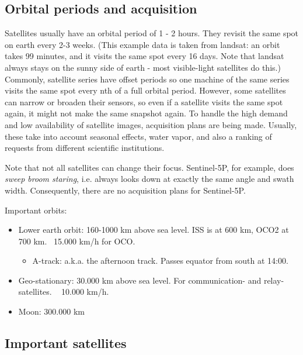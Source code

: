 \subsection{Orbital periods and acquisition}
Satellites usually have an orbital period of 1 - 2 hours. They revisit the same spot on earth every 2-3 weeks.
(This example data is taken from landsat: an orbit takes 99 minutes, and it visits the same spot every 16 days.
Note that landsat always stays on the sunny side of earth - most visible-light satellites do this.)
Commonly, satellite series have offset periods so one machine of the same series
visits the same spot every nth of a full orbital period.
However, some satellites can narrow or broaden their sensors, so even if
a satellite visits the same spot again, it might not make the same snapshot again.
To handle the high demand and low availability of satellite images, acquisition plans are being made.
Usually, these take into account seasonal effects,
water vapor, and also a ranking of requests from different scientific institutions.


Note that not all satellites can change their focus. Sentinel-5P, for example, does \emph{sweep broom staring}, i.e. always looks down at exactly the same angle and swath width.
Consequently, there are no acquisition plans for Sentinel-5P.


Important orbits:
\begin{itemize}
    \item Lower earth orbit: 160-1000 km above sea level. ISS is at 600 km, OCO2 at 700 km. ~15.000 km/h for OCO. \begin{itemize}
        \item A-track: a.k.a. the afternoon track. Passes equator from south at 14:00.
    \end{itemize}
    \item Geo-stationary: 30.000 km above sea level. For communication- and relay-satellites. ~ 10.000 km/h.
    \item Moon: 300.000 km
\end{itemize}







\subsection{Important satellites}


